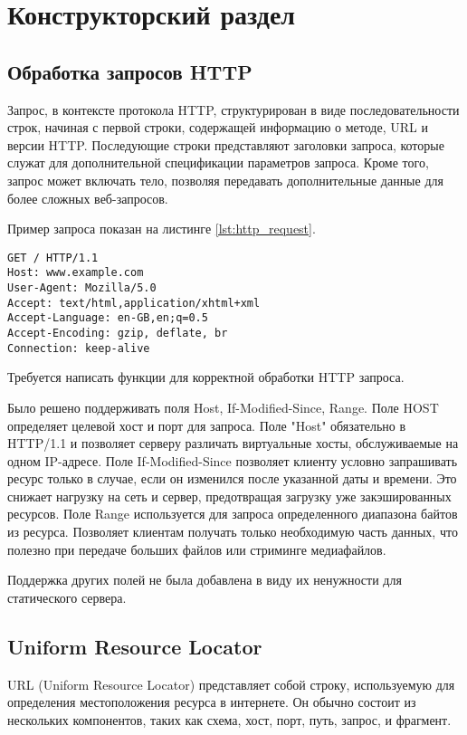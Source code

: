 \section{Конструкторский раздел}

\subsection{Обработка запросов HTTP}

Запрос, в контексте протокола HTTP, структурирован в виде последовательности строк, начиная с первой строки, содержащей информацию о методе, URL и версии HTTP. Последующие строки представляют заголовки запроса, которые служат для дополнительной спецификации параметров запроса. Кроме того, запрос может включать тело, позволяя передавать дополнительные данные для более сложных веб-запросов.

Пример запроса показан на листинге \ref{lst:http_request}.

\captionsetup{singlelinecheck = false, justification=raggedright}
\begin{lstlisting}[label=lst:http_request,caption=HTTP запрос]
GET / HTTP/1.1
Host: www.example.com
User-Agent: Mozilla/5.0
Accept: text/html,application/xhtml+xml
Accept-Language: en-GB,en;q=0.5
Accept-Encoding: gzip, deflate, br
Connection: keep-alive
\end{lstlisting}

Требуется написать функции для корректной обработки HTTP запроса.

Было решено поддерживать поля Host, If-Modified-Since, Range.
Поле HOST определяет целевой хост и порт для запроса. Поле "Host" обязательно в HTTP/1.1 и позволяет серверу различать виртуальные хосты, обслуживаемые на одном IP-адресе.
Поле If-Modified-Since позволяет клиенту условно запрашивать ресурс только в случае, если он изменился после указанной даты и времени. Это снижает нагрузку на сеть и сервер, предотвращая загрузку уже закэшированных ресурсов. 
Поле Range используется для запроса определенного диапазона байтов из ресурса. Позволяет клиентам получать только необходимую часть данных, что полезно при передаче больших файлов или стриминге медиафайлов.

Поддержка других полей не была добавлена в виду их ненужности для статического сервера.

\subsection{Uniform Resource Locator}
URL (Uniform Resource Locator) представляет собой строку, используемую для определения местоположения ресурса в интернете. Он обычно состоит из нескольких компонентов, таких как схема, хост, порт, путь, запрос, и фрагмент.

